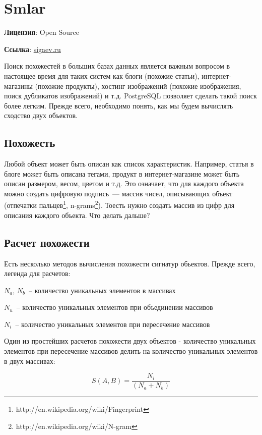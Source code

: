 \section{Smlar}
\textbf{Лицензия}: Open Source

\textbf{Ссылка}: \href{http://sigaev.ru/git/gitweb.cgi?p=smlar.git;a=blob;hb=HEAD;f=README}{sigaev.ru}

Поиск похожестей в больших базах данных является важным вопросом в настоящее время для таких систем как блоги (похожие статьи), интернет-магазины (похожие продукты), хостинг изображений (похожие изображения, поиск дубликатов изображений) и т.д. PostgreSQL позволяет сделать такой поиск более легким. Прежде всего, необходимо понять, как мы будем вычислять сходство двух объектов.

\subsection{Похожесть}

Любой объект может быть описан как список характеристик. Например, статья в блоге может быть описана тегами, продукт в интернет-магазине может быть описан размером, весом, цветом и т.д. Это означает, что для каждого объекта можно создать цифровую подпись~--- массив чисел, описывающих объект (отпечатки пальцев\footnote{http://en.wikipedia.org/wiki/Fingerprint}, n-grams\footnote{http://en.wikipedia.org/wiki/N-gram}). Тоесть нужно создать массив из цифр для описания каждого объекта. Что делать дальше?

\subsection{Расчет похожести}

Есть несколько методов вычисления похожести сигнатур обьектов. Прежде всего, легенда для расчетов:

$N_a$, $N_b$~-- количество уникальных элементов в массивах

$N_u$~-- количество уникальных элементов при объединении массивов

$N_i$~-- количество уникальных элементов при пересечение массивов

Один из простейших расчетов похожести двух объектов - количество уникальных элементов при пересечение массивов делить на количество уникальных элементов в двух массивах:

\begin{equation}
 \label{eq:smlar1}
 S(A,B) = \frac{N_{i}}{(N_{a}+N_{b})}
\end{equation}

